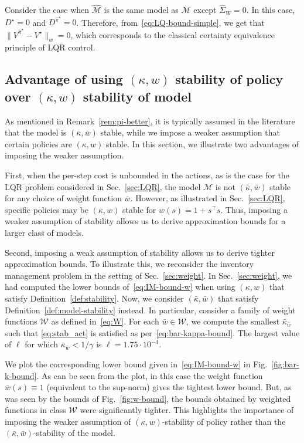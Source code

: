 \documentclass[letterpaper, 10pt]{IEEEtran}
\newcommand*\ALPHABET{\mathcal}
\newcommand*\tuple{\kappa, w}
\begin{document}
\begin{remark}
    Consider the case when $\hat {\ALPHABET M}$ is the same model as $\ALPHABET M$ except $\hat \Sigma_W = 0$. In this case, $D^\star = 0$ and $D^{\hat \pi^\star} = 0$. Therefore, from~\eqref{eq:LQ-bound-simple}, we get that $\| V^{\hat \pi^\star} - V^\star\|_{w} = 0$, which corresponds to the classical certainty equivalence principle of LQR control.
\end{remark}

\subsection{Advantage of using $(\tuple)$ stability of policy over $(\tuple)$ stability of model}\label{sec:pi_better}
As mentioned in Remark~\ref{rem:pi-better}, it is typically assumed in the literature that the model is $(\bar \kappa, \bar w)$ stable, while we impose a weaker assumption that certain policies are $(\kappa, w)$ stable. In this section, we illustrate two advantages of imposing the weaker assumption.

First, when the per-step cost is unbounded in the actions, as is the case for the LQR problem considered in Sec.~\ref{sec:LQR}, the model $\ALPHABET M$ is not $(\bar \kappa, \bar w)$ stable for any choice of weight function $\bar w$. However, as illustrated in Sec.~\ref{sec:LQR}, specific policies may be $(\kappa, w)$ stable for $w(s) = 1 + s^\intercal s$. Thus, imposing a weaker assumption of stability allows us to derive approximation bounds for a larger class of models.

Second, imposing a weak assumption of stability allows us to derive tighter approximation bounds. To illustrate this, we reconsider the 
inventory management problem in the setting of Sec.~\ref{sec:weight}. In Sec.~\ref{sec:weight}, we had computed the lower bounds of~\eqref{eq:IM-bound-w} when using $(\kappa,w)$ that satisfy Definition~\ref{def:stability}. Now, we consider $(\bar \kappa, \bar w)$ that satisfy Definition~\ref{def:model-stability} instead. In particular, consider 
a family of weight functions $\ALPHABET W$ as defined in~\eqref{eq:W}.
For each $\bar w\in \ALPHABET W$, we compute the smallest $\bar\kappa_{\bar w}$ such that \eqref{eq:stab_act} is satisfied as per~\eqref{eq:bar-kappa-bound}. The largest value of $\ell$ for which $\bar\kappa_{\bar w} < 1/{\gamma}$ is $\ell = 1.75 \cdot 10^{-4}$. 

We plot the corresponding lower bound given in~\eqref{eq:IM-bound-w} in Fig.~\ref{fig:bar-k-bound}. As can be seen from the plot, in this case the weight function $\bar w(s) \equiv 1$ (equivalent to the sup-norm) gives the tightest lower bound. But, as was seen by the bounds of Fig.~\ref{fig:w-bound}, the bounds obtained by weighted functions in class $\ALPHABET W$ were significantly tighter. This highlights the importance of imposing the weaker assumption of $(\tuple)$-stability of policy rather than the $(\bar \kappa, \bar w)$-stability of the model.
\end{document}
